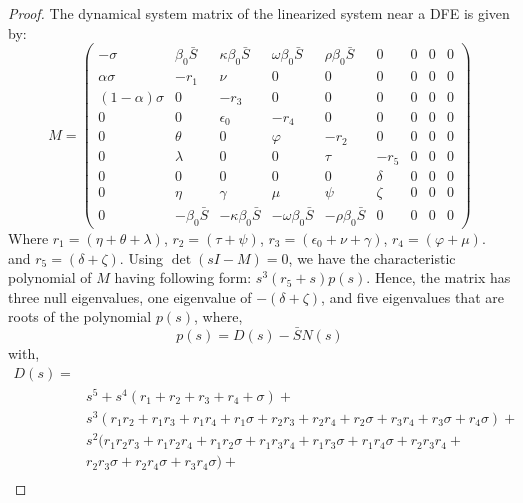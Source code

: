 \documentclass[authoryear,preprint]{elsarticle}
\begin{document}
\begin{proof}
The dynamical system matrix of the linearized system near a DFE is given by:
\begin{equation}
M = 
\begin{pmatrix}
-\sigma & \beta_0 \bar{S}& \kappa \beta_0 \bar{S}& \omega \beta_0 \bar{S}& \rho \beta_0 \bar{S}& 0 &0 & 0 &0 \\
\alpha \sigma & -r_1  & \nu & 0 & 0 & 0 &0 & 0 &0 \\
\left( 1- \alpha \right) \sigma & 0 & -r_3 & 0 & 0 & 0 &0 & 0 &0 \\
0 & 0 & \epsilon_0 & -r_4  & 0 & 0 &0 & 0 &0 \\
0 & \theta & 0 & \varphi & -r_2  & 0 &0 & 0 &0 \\
0 & \lambda & 0 & 0 & \tau & -r_5 &0 & 0 &0 \\
0 & 0 & 0 & 0 & 0 & \delta &0 & 0 &0 \\
0 & \eta & \gamma & \mu & \psi & \zeta &0 & 0 &0 \\
0 & -\beta_0 \bar{S}& -\kappa \beta_0 \bar{S}& -\omega \beta_0 \bar{S}& -\rho \beta_0 \bar{S}& 0 &0 & 0 &0
\end{pmatrix}
\end{equation}
Where $r_1 = \left( \eta + \theta + \lambda \right) $, $r_2 = \left( \tau + \psi \right) $, $r_3 = \left( \epsilon_0 + \nu + \gamma\right) $, $r_4 =  \left( \varphi + \mu\right)$. and $r_5=\left( \delta + \zeta\right)$. Using $\det(sI-M) = 0$, we have the characteristic polynomial of $M$ having following form:  $s^{3} \left(r_{5} + s\right) p(s)$. Hence, the matrix has three null eigenvalues, one eigenvalue of $-\left( \delta + \zeta\right)$, and five eigenvalues that are roots of the polynomial $p(s)$, where,
\begin{equation}
p(s) = D(s) - \bar{S}N(s)
\end{equation}
%
with, 
\begin{equation}
\begin{split}
D(s) = \\
& s^{5} + s^{4} \left(r_{1} + r_{2} + r_{3} + r_{4} + \sigma\right) + \\
& s^{3} \left(r_{1} r_{2} + r_{1} r_{3} + r_{1} r_{4} + r_{1} \sigma + r_{2} r_{3} + r_{2} r_{4} + r_{2} \sigma + r_{3} r_{4} + r_{3} \sigma + r_{4} \sigma\right) + \\
& s^{2} (r_{1} r_{2} r_{3} + r_{1} r_{2} r_{4} + r_{1} r_{2} \sigma + r_{1} r_{3} r_{4} + r_{1} r_{3} \sigma + r_{1} r_{4} \sigma + r_{2} r_{3} r_{4} +\\
& r_{2} r_{3} \sigma + r_{2} r_{4} \sigma + r_{3} r_{4} \sigma) + \\ 

\end{split}
\end{equation}
\end{proof}
\end{document}
